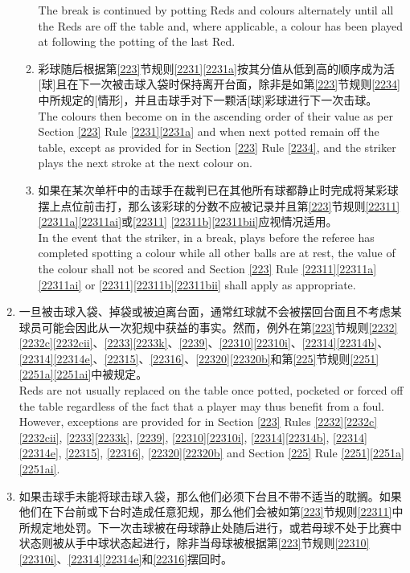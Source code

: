 \begin{enumerate}[label=(\alph*)]
\begin{enumerate}[label=(\roman*)]
        The break is continued by potting Reds and colours alternately until all the Reds are off the table and, where applicable, a colour has been played at following the potting of the last Red.
        \item \label{2233hiii}彩球随后根据第\ref{223}节规则\ref{2231}\ref{2231a}按其分值从低到高的顺序成为活[球]且在下一次被击球入袋时保持离开台面，除非是如第\ref{223}节规则\ref{2234}中所规定的[情形]，并且击球手对下一颗活[球]彩球进行下一次击球。\\
        The colours then become on in the ascending order of their value as per Section \ref{223} Rule \ref{2231}\ref{2231a} and when next potted remain off the table, except as provided for in Section \ref{223} Rule \ref{2234}, and the striker plays the next stroke at the next colour on.
        \item 如果在某次单杆中的击球手在裁判已在其他所有球都静止时完成将某彩球摆上点位前击打，那么该彩球的分数不应被记录并且第\ref{223}节规则\ref{22311}\ref{22311a}\ref{22311ai}或\ref{22311} \ref{22311b}\ref{22311bii}应视情况适用。\\
        In the event that the striker, in a break, plays before the referee has completed spotting a colour while all other balls are at rest, the value of the colour shall not be scored and Section \ref{223} Rule \ref{22311}\ref{22311a} \ref{22311ai} or \ref{22311}\ref{22311b}\ref{22311bii} shall apply as appropriate.
    \end{enumerate}
    \item 一旦被击球入袋、掉袋或被迫离台面，通常红球就不会被摆回台面且不考虑某球员可能会因此从一次犯规中获益的事实。然而，例外在第\ref{223}节规则\ref{2232}\ref{2232c}\ref{2232cii}、\ref{2233}\ref{2233k}、\ref{2239}、\ref{22310}\ref{22310i}、\ref{22314}\ref{22314b}、\ref{22314}\ref{22314e}、\ref{22315}、\ref{22316}、\ref{22320}\ref{22320b}和第\ref{225}节规则\ref{2251}\ref{2251a}\ref{2251ai}中被规定。\\
    Reds are not usually replaced on the table once potted, pocketed or forced off the table regardless of the fact that a player may thus benefit from a foul. However, exceptions are provided for in Section \ref{223} Rules \ref{2232}\ref{2232c}\ref{2232cii}, \ref{2233}\ref{2233k}, \ref{2239}, \ref{22310}\ref{22310i}, \ref{22314}\ref{22314b}, \ref{22314}\ref{22314e}, \ref{22315}, \ref{22316}, \ref{22320}\ref{22320b} and Section \ref{225} Rule \ref{2251}\ref{2251a}\ref{2251ai}.
    \item 如果击球手未能将球击球入袋，那么他们必须下台且不带不适当的耽搁。如果他们在下台前或下台时造成任意犯规，那么他们会被如第\ref{223}节规则\ref{22311}中所规定地处罚。下一次击球被在母球静止处随后进行，或若母球不处于比赛中状态则被从手中球状态起进行，除非当母球被根据第\ref{223}节规则\ref{22310}\ref{22310i}、\ref{22314}\ref{22314e}和\ref{22316}摆回时。\\

\end{enumerate}
